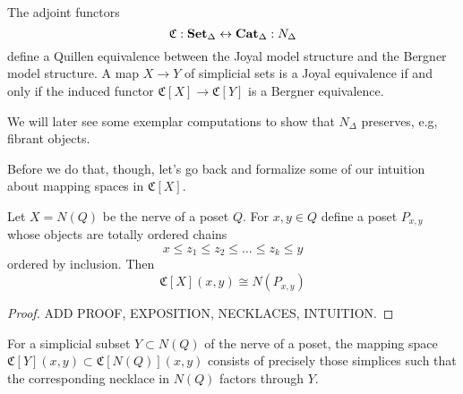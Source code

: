 \begin{theorem}[\cite{???}]
	The adjoint functors  
	\[
	\mathfrak{C} : \operatorname{\mathbf{Set}_{\Delta}} \leftrightarrow \operatorname{\mathbf{Cat}_{\Delta}} : N_{\Delta}
	\]
	define a Quillen equivalence between the Joyal model structure and the Bergner model structure. A map $X\to Y$ of simplicial sets is a Joyal equivalence if and only if the induced functor $\mathfrak{C}[X]\to \mathfrak{C}[Y]$ is a Bergner equivalence. 
\end{theorem}

We will later see some exemplar computations to show that $N_\Delta$ preserves, e.g, fibrant objects. 

Before we do that, though, let's go back and formalize some of our intuition about mapping spaces in $\mathfrak{C}[X]$. 


\begin{theorem}
	Let $X=N(Q)$ be the nerve of a poset $Q$. For $x,y\in Q$ define a poset $P_{x,y}$ whose objects are totally ordered chains 
	\[
	x\leq z_1\leq z_2\leq \ldots \leq z_k\leq y
	\]
	ordered by inclusion. Then 
	\[
	\mathfrak{C}[X](x,y)\cong N(P_{x,y}) 
	\]
\end{theorem}

\begin{proof}
	ADD PROOF, EXPOSITION, NECKLACES, INTUITION.
\end{proof}

\begin{note}
	For a simplicial subset $Y\subset N(Q)$ of the nerve of a poset, the mapping space $\mathfrak{C}[Y](x,y)\subset \mathfrak{C}[N(Q)](x,y)$ consists of precisely those simplices such that the corresponding necklace in $N(Q)$ factors through $Y$. 
\end{note}

